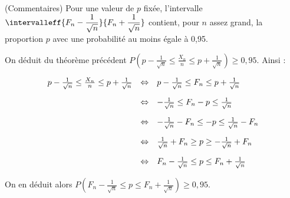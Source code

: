 \documentclass[12pt, french]{book}
\begin{document}
\begin{Thm}{(Commentaires)}
	Pour une valeur de $p$ fixée, l'intervalle $\intervalleff{F_n-\dfrac{1}{\sqrt{n}}}{F_n+\dfrac{1}{\sqrt{n}}}$ contient, pour $n$ assez grand, la proportion $p$ avec une probabilité au moins égale à 0,95.
\end{Thm}




\begin{Demo}
	On déduit du théorème précédent $P\left(p - \frac{1}{\sqrt n} \leq \frac{X_n}{n} \leq p + \frac{1}{\sqrt n}\right) \geq 0,95$. Ainsi :
	
	\[\begin{array}{r@{\quad \Leftrightarrow \quad}l}
		p - \frac{1}{\sqrt n} \leq \frac{X_n}{n} \leq p + \frac{1}{\sqrt n} & p - \frac{1}{\sqrt n} \leq F_n \leq p + \frac{1}{\sqrt n} \\[12pt]
		
		& - \frac{1}{\sqrt n} \leq F_n - p \leq \frac{1}{\sqrt n} \\[12pt]
		
		& - \frac{1}{\sqrt n} - F_n \leq - p \leq \frac{1}{\sqrt n} - F_n\\[12pt]
		
		& \frac{1}{\sqrt n} + F_n \geq p \geq -\frac{1}{\sqrt n}+F_n \\[12pt]
		
		& F_n - \frac{1}{\sqrt n} \leq p \leq  F_n + \frac{1}{\sqrt n}
	\end{array}\]
	
	On en déduit alors $P\left(F_n - \frac{1}{\sqrt n} \leq p \leq  F_n + \frac{1}{\sqrt n}\right) \geq 0,95$.
\end{Demo}
\end{document}
